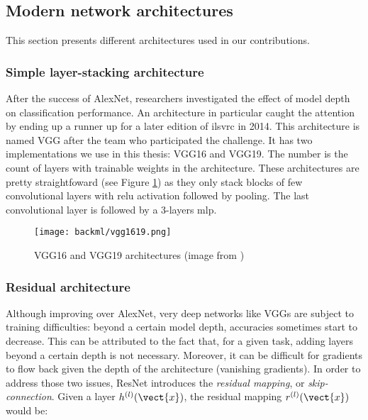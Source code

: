 
\subsection{Modern network architectures}
\label{ssec:backml:dl:modernarchi}

This section presents different architectures used in our contributions.

\subsubsection{Simple layer-stacking architecture}
\label{sssec:backml:arch:layerstacking}
After the success of AlexNet, researchers investigated the effect of model depth
on classification performance. An architecture in particular caught the attention
by ending up a runner up for a later edition of \acrshort{ilsvrc} in 2014. This
architecture is named VGG \parencite{simonyan2014very} after the team who participated
the challenge. It has two implementations we use in this thesis: VGG16 and VGG19.
The number is the count of layers with trainable weights in the architecture.
These architectures are pretty straightfoward (see Figure \ref{fig:backml:vgg})
as they only stack blocks of few convolutional layers with \acrshort{relu} activation
followed by pooling. The last convolutional layer is followed by a 3-layers
\acrshort{mlp}.

\begin{figure}
  \centering
  \texttt{[image: backml/vgg1619.png]}
  \caption{VGG16 and VGG19 architectures (image from \parencite{img:vgg1619})}
  \label{fig:backml:vgg}
\end{figure}

\subsubsection{Residual architecture}
\label{sssec:backml:arch:residual}

Although improving over AlexNet, very deep networks like VGGs are subject to
training difficulties: beyond a certain model depth, accuracies sometimes start
to decrease. This can be attributed to the fact that, for a given task, adding
layers beyond a certain depth is not necessary. Moreover, it can be difficult for
gradients to flow back given the depth of the architecture (\ie vanishing gradients).
In order to address those two issues, ResNet \parencite{he2016deep} introduces
the \textit{residual mapping}, or \textit{skip-connection}. Given a layer
$h^{(l)}(\vect{x})$, the residual mapping $r^{(l)}(\vect{x})$ would be:


